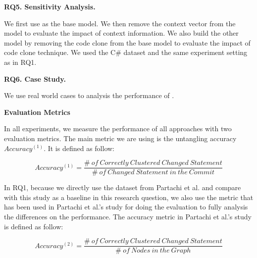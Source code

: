 {\color{red}{Need to add more.}}

\noindent\textbf{RQ5. Sensitivity Analysis.}

We first use \tool as the base model. We then remove the context vector from the model to evaluate the impact of context information. We also build the other model by removing the code clone from the base model to evaluate the impact of code clone technique. We used the C\# dataset and the same experiment setting as in RQ1.

\noindent\textbf{RQ6. Case Study.} 

We use real world cases to analysis the performance of \tool.

\noindent\textbf{Evaluation Metrics}


In all experiments, we measure the performance of all approaches with two evaluation metrics. The main metric we are using is the untangling accuracy $Accuracy^{(1)}$. It is defined as follow:

\begin{equation}\label{eq7}
	Accuracy^{(1)} = \frac{\#\:of\:Correctly\:Clustered\:Changed\:Statement}{\#\:of\:Changed\:Statement\:in\:the\:Commit}
\end{equation}

In RQ1, because we directly use the dataset from Partachi et al. \cite{flexeme-fse20} and compare with this study as a baseline in this research question, we also use the metric that has been used in Partachi et al.'s \cite{flexeme-fse20} study for doing the evaluation to fully analysis the differences on the performance. The accuracy metric in Partachi et al.'s \cite{flexeme-fse20} study is defined as follow:

\begin{equation}\label{eq8}
	Accuracy^{(2)} = \frac{\#\:of\:Correctly\: Clustered\: Changed\: Statement}{\#\: of\: Nodes\: in\: the\: Graph}
\end{equation}